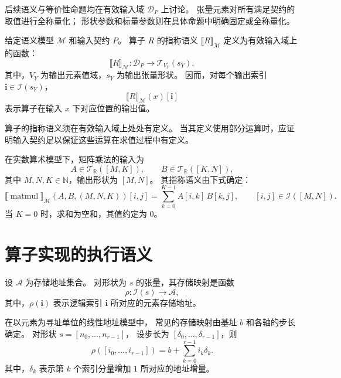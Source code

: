 后续语义与等价性命题均在有效输入域 \(\mathcal D_P\) 上讨论。
张量元素对所有满足契约的取值进行全称量化；
形状参数和标量参数则在具体命题中明确固定或全称量化。

\begin{definition}[算子的指称语义]
    给定语义模型 \(\mathcal M\) 和输入契约 \(P\)。
    算子 \(R\) 的指称语义 \(\llbracket R\rrbracket_{\mathcal M}\) 定义为有效输入域上的函数：
    \[
      \llbracket R\rrbracket_{\mathcal M}: 
      \mathcal D_P \to \mathcal T_{V_Y}(s_Y),
    \]
    其中，\(V_Y\) 为输出元素值域，\(s_Y\) 为输出张量形状。
    因而，对每个输出索引
    \(\boldsymbol i\in\mathcal I(s_Y)\)，
    \[
      \llbracket R\rrbracket_{\mathcal M}(x)[\boldsymbol i]
    \]
    表示算子在输入 \(x\) 下对应位置的输出值。
\end{definition}
  
算子的指称语义须在有效输入域上处处有定义。
当其定义使用部分运算时，应证明输入契约足以保证这些运算在求值过程中有定义。

\begin{example}[矩阵乘法的指称语义]
\label{ex:denotational-semantic-of-matrix-multiplication}
在实数算术模型下，矩阵乘法的输入为
\[
  A\in\mathcal T_{\mathbb R}([M,K]),
  \qquad
  B\in\mathcal T_{\mathbb R}([K,N]),
\]
其中 \(M,N,K\in\mathbb N\)，输出形状为 \([M,N]\)。
其指称语义由下式确定：
\[
  \llbracket \operatorname{matmul}\rrbracket_{\mathcal M}
  (A,B,(M,N,K))[i,j]
  =
  \sum_{k=0}^{K-1} A[i,k]\,B[k,j],
  \qquad [i,j]\in\mathcal I([M,N]).
\]
当 \(K=0\) 时，求和为空和，其值约定为 \(0\)。
\end{example}

\section{算子实现的执行语义}
\label{sec:execution-semantics-of-implementations}

\begin{definition}[张量的存储映射]
    设 \(\mathcal A\) 为存储地址集合。
    对形状为 \(s\) 的张量，其存储映射是函数
    \[
      \rho:\mathcal I(s)\to\mathcal A,
    \]
    其中，\(\rho(\boldsymbol i)\) 表示逻辑索引
    \(\boldsymbol i\) 所对应的元素存储地址。
\end{definition}

在以元素为寻址单位的线性地址模型中，
常见的存储映射由基址 \(b\) 和各轴的步长确定。
对形状 \(s=[n_0,\ldots,n_{r-1}]\)，
设步长为 \([\delta_0,\ldots,\delta_{r-1}]\)，则
\[
\rho([i_0,\ldots,i_{r-1}])
=
b+\sum_{k=0}^{r-1}i_k\delta_k.
\]
其中，\(\delta_k\) 表示第 \(k\) 个索引分量增加 \(1\)
所对应的地址增量。

